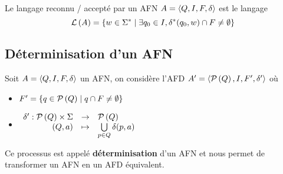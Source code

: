 \begin{definition}
	Le langage reconnu / accepté par un AFN $A = \langle Q, I, F, \delta \rangle$ est le langage
	$$ \mathcal{L}\left(A\right) = \left\{w \in \Sigma^{*} \mid \exists q_0 \in I, \delta^{*}(q_0, w) \cap F \neq \emptyset\right\} $$

\end{definition}

\subsection{Déterminisation d'un AFN}

Soit $A = \langle Q, I, F, \delta \rangle$ un AFN, on considère l'AFD $A' = \langle \mathcal{P}\left(Q\right), I, F', \delta' \rangle$ où
\begin{itemize}
	\item $F' = \left\{q \in \mathcal{P}\left(Q\right) \mid q \cap F \neq \emptyset\right\}$
	      \vspace{0.25cm}
	\item $ \begin{array}{rcl}
			      \delta' : \mathcal{P}\left(Q\right) \times \Sigma & \to     & \mathcal{P}\left(Q\right)                              \\
			      (Q, a)                              & \mapsto & \bigcup\limits_{p \in Q} \delta(p, a)
		      \end{array} $
\end{itemize}

\vspace{0.25cm}

Ce processus est appelé \textbf{déterminisation} d'un AFN et nous permet de transformer un AFN en un AFD équivalent.

